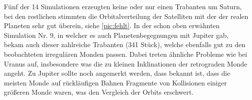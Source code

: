 \documentclass[12pt,a4paper,twoside]{article}
\renewcommand{\cite}{\citep}
\begin{document}
Fünf der 14 Simulationen erzeugten keine oder nur einen Trabanten um Saturn, bei den restlichen stimmten die Orbitalverteilung der Satelliten mit der der realen Planeten sehr gut überein, siehe \ref{pic:fehlt}\cite{Nesvorny2007}. %
In der schon oben erwähnten Simulation Nr. 9, in welcher es auch Planetenbegegnungen mit Jupiter gab, bekam auch dieser zahlreiche Trabanten (341 Stück), welche ebenfalls gut zu den beobachteten irregulären Monden passen. Dabei treten ähnliche Probleme wie bei Uranus auf, insbesondere was die zu kleinen Inklinationen der retrograden Monde angeht.
Zu Jupiter sollte noch angemerkt werden, dass bekannt ist, dass die meisten Monde auf rückläufigen Bahnen Fragmente von Kollisionen einiger größeren Monde waren, was den Vergleich der Orbits erschwert\cite{Nesvorny2004,Nesvorny2007}.
\end{document}
